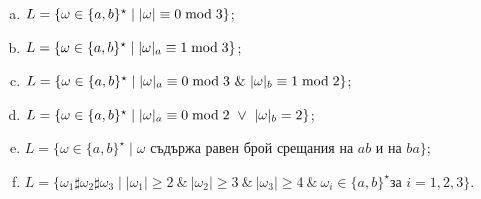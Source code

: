 {\begin{problem}
\begin{enumerate}[a)]
    $L = \{\omega \in \{a,b\}^\star \mid \text{ всяко }a\mbox{ в }\omega\text{ се следва от поне едно }b\}$;
  \item
    $L = \{\omega \in \{a,b\}^\star \mid \vert{\omega}\vert \equiv 0 \bmod 3\}$;
  \item
    $L = \{\omega \in \{a,b\}^\star \mid \vert{\omega}\vert_{a} \equiv 1 \bmod 3\}$;
  \item
    $L = \{\omega \in \{a,b\}^\star \mid \vert{\omega}\vert_{a} \equiv 0 \bmod 3\ \&\ \vert{\omega}\vert_{b} \equiv 1 \bmod 2\}$;
  \item
    $L = \{\omega \in \{a,b\}^\star \mid \vert{\omega}\vert_{a} \equiv 0 \bmod 2\ \vee\ \vert{\omega}\vert_{b} = 2\}$;
  \item
    $L = \{\omega \in \{a,b\}^\star \mid \omega \text{ съдържа равен брой срещания на }ab\text{ и на }ba\}$;
  \item
    $L = \{\omega_1 \sharp \omega_2 \sharp \omega_3 \mid |\omega_1| \geq 2\ \&\ |\omega_2| \geq 3\ \&\ |\omega_3| \geq 4\ \&\ \omega_i \in \{a,b\}^\star\text{
      за }i = 1,2,3\}$.
  \end{enumerate}
\end{problem}

}
